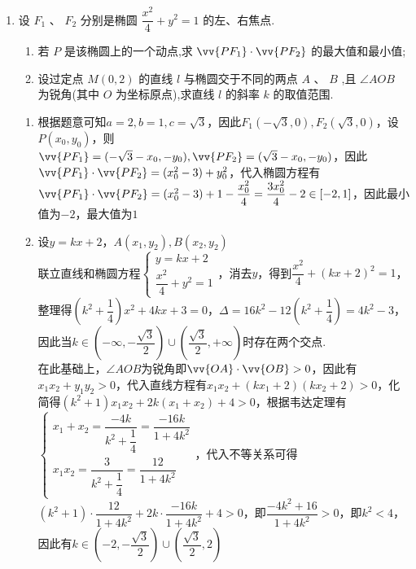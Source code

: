 \begin{enumerate}
\begin{jieda}
\begin{enumerate}
        \end{enumerate}
    \end{jieda}

    \item 设 ${F}_{1}\text{ 、 }{F}_{2}$ 分别是椭圆 $\dfrac{{x}^{2}}{4} + {y}^{2} = 1$ 的左、右焦点.
    \begin{enumerate}
        \item 若 $P$ 是该椭圆上的一个动点,求 $\vv{P{F}_{1}} \cdot  \vv{P{F}_{2}}$ 的最大值和最小值;
        \item 设过定点 $M\left( {0,2}\right)$ 的直线 $l$ 与椭圆交于不同的两点 $A$ 、 $B$ ,且 $\angle {AOB}$ 为锐角(其中 $O$ 为坐标原点),求直线 $l$ 的斜率 $k$ 的取值范围.
    \end{enumerate}
    \begin{jieda}
        \begin{enumerate}
            \item 根据题意可知$a = 2, b = 1, c = \sqrt{3}$，因此$F_1(-\sqrt{3}, 0), F_2(\sqrt{3}, 0)$，设$P(x_0, y_0)$，则$\vv{P{F}_{1}} = (-\sqrt{3}-x_0, -y_0), \vv{PF_2} = (\sqrt{3}-x_0, -y_0)$，因此$\vv{P{F}_{1}} \cdot \vv{P{F}_{2}} = (x_0^2-3)+y_0^2$，代入椭圆方程有$\vv{P{F}_{1}} \cdot \vv{P{F}_{2}} = (x_0^2-3)+1-\dfrac{x_0^2}{4} = \dfrac{3x_0^2}{4}-2 \in [-2, 1]$，因此最小值为$-2$，最大值为$1$
            \item 设$y = kx+2$，$A(x_1, y_2), B(x_2, y_2)$ \\
            联立直线和椭圆方程$\left\{\begin{array}{l}
                 y = kx+2 \\
                 \dfrac{{x}^{2}}{4} + {y}^{2} = 1
            \end{array}\right.$，消去$y$，得到$\dfrac{x^2}{4} + (kx+2)^2 = 1$，整理得$\left(k^2+\dfrac{1}{4}\right)x^2+4kx+3=0$，$\Delta = 16k^2-12\left(k^2+\dfrac{1}{4}\right) = 4k^2-3$，因此当$k \in \left(-\infty, -\dfrac{\sqrt{3}}{2}\right) \cup \left(\dfrac{\sqrt{3}}{2}, +\infty\right)$时存在两个交点. \\
            在此基础上，$\angle AOB$为锐角即$\vv{OA} \cdot \vv{OB} > 0$，因此有$x_1x_2+y_1y_2 > 0$，代入直线方程有$x_1x_2+(kx_1+2)(kx_2+2) > 0$，化简得$(k^2+1)x_1x_2+2k(x_1+x_2)+4>0$，根据韦达定理有$\left\{\begin{array}{l}
                 x_1+x_2 = \dfrac{-4k}{k^2+\dfrac{1}{4}} = \dfrac{-16k}{1+4k^2}  \\
                 x_1x_2 = \dfrac{3}{k^2+\dfrac{1}{4}} = \dfrac{12}{1+4k^2}
            \end{array}\right.$，代入不等关系可得$(k^2+1)\cdot \dfrac{12}{1+4k^2} + 2k \cdot \dfrac{-16k}{1+4k^2} + 4>0$，即$\dfrac{-4k^2+16}{1+4k^2} > 0$，即$k^2 < 4$，因此有$k \in \left(-2, -\dfrac{\sqrt{3}}{2}\right) \cup \left(\dfrac{\sqrt{3}}{2}, 2\right)$
        \end{enumerate}
    \end{jieda}
\end{enumerate}
